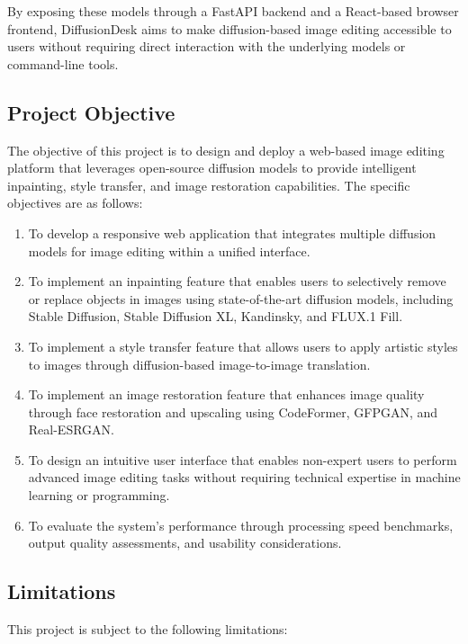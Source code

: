 \documentclass[12pt,a4paper]{report}
\begin{document}
By exposing these models through a FastAPI backend and a React-based browser frontend, DiffusionDesk aims to make diffusion-based image editing accessible to users without requiring direct interaction with the underlying models or command-line tools.

\subsection{Project Objective}

The objective of this project is to design and deploy a web-based image editing platform that leverages open-source diffusion models to provide intelligent inpainting, style transfer, and image restoration capabilities. The specific objectives are as follows:

\begin{enumerate}
    \item To develop a responsive web application that integrates multiple diffusion models for image editing within a unified interface.
    \item To implement an inpainting feature that enables users to selectively remove or replace objects in images using state-of-the-art diffusion models, including Stable Diffusion, Stable Diffusion XL, Kandinsky, and FLUX.1 Fill.
    \item To implement a style transfer feature that allows users to apply artistic styles to images through diffusion-based image-to-image translation.
    \item To implement an image restoration feature that enhances image quality through face restoration and upscaling using CodeFormer, GFPGAN, and Real-ESRGAN.
    \item To design an intuitive user interface that enables non-expert users to perform advanced image editing tasks without requiring technical expertise in machine learning or programming.
    \item To evaluate the system's performance through processing speed benchmarks, output quality assessments, and usability considerations.
\end{enumerate}

\subsection{Limitations}

This project is subject to the following limitations:
\end{document}
